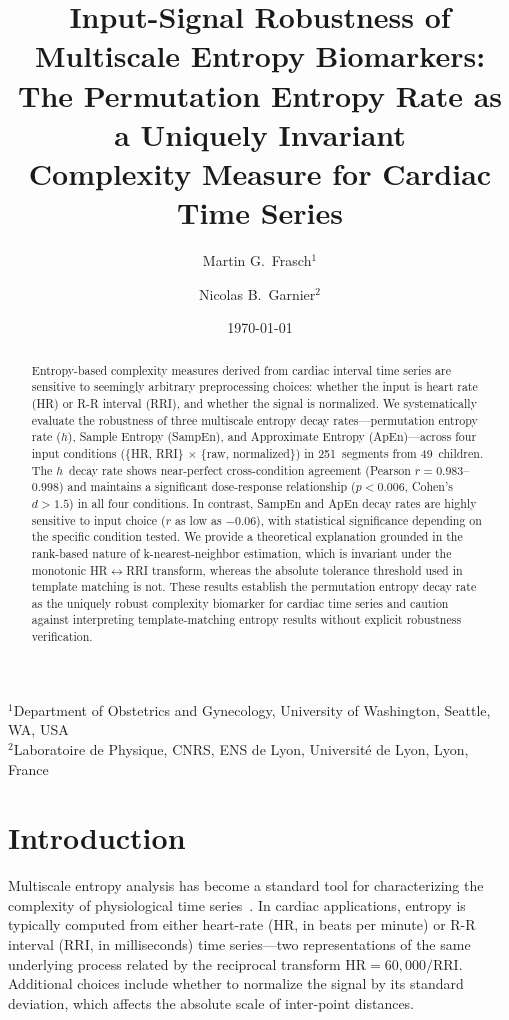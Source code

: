 \documentclass[12pt,a4paper]{article}
\title{Input-Signal Robustness of Multiscale Entropy Biomarkers:\\
The Permutation Entropy Rate as a Uniquely Invariant\\
Complexity Measure for Cardiac Time Series}
\author{Martin G.\ Frasch$^{1}$ \and Nicolas B.\ Garnier$^{2}$}
\date{\today}
\newcommand{\affiliations}{%
$^{1}$Department of Obstetrics and Gynecology, University of Washington, Seattle, WA, USA\\
$^{2}$Laboratoire de Physique, CNRS, ENS de Lyon, Universit\'{e} de Lyon, Lyon, France
}
\begin{document}
\maketitle
\begingroup
\centering
\small
\affiliations
\par
\endgroup
\vspace{1em}

\begin{abstract}
Entropy-based complexity measures derived from cardiac interval time series are sensitive to seemingly arbitrary preprocessing choices: whether the input is heart rate (HR) or R-R interval (RRI), and whether the signal is normalized.
We systematically evaluate the robustness of three multiscale entropy decay rates---permutation entropy rate ($h$), Sample Entropy (SampEn), and Approximate Entropy (ApEn)---across four input conditions (\{HR, RRI\} $\times$ \{raw, normalized\}) in 251~segments from 49~children.
The $h$~decay rate shows near-perfect cross-condition agreement (Pearson $r = 0.983$--$0.998$) and maintains a significant dose-response relationship ($p < 0.006$, Cohen's $d > 1.5$) in all four conditions.
In contrast, SampEn and ApEn decay rates are highly sensitive to input choice ($r$ as low as $-0.06$), with statistical significance depending on the specific condition tested.
We provide a theoretical explanation grounded in the rank-based nature of k-nearest-neighbor estimation, which is invariant under the monotonic HR$\leftrightarrow$RRI transform, whereas the absolute tolerance threshold used in template matching is not.
These results establish the permutation entropy decay rate as the uniquely robust complexity biomarker for cardiac time series and caution against interpreting template-matching entropy results without explicit robustness verification.
\end{abstract}


\section{Introduction}\label{sec:intro}

Multiscale entropy analysis has become a standard tool for characterizing the complexity of physiological time series~\citep{costa2002,costa2005}.
In cardiac applications, entropy is typically computed from either heart-rate (HR, in beats per minute) or R-R interval (RRI, in milliseconds) time series---two representations of the same underlying process related by the reciprocal transform $\text{HR} = 60{,}000 / \text{RRI}$.
Additional choices include whether to normalize the signal by its standard deviation, which affects the absolute scale of inter-point distances.
\end{document}
